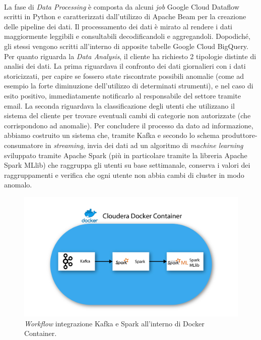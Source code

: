 \\
La fase di \emph{Data Processing} è composta da alcuni \emph{job} Google Cloud Dataflow scritti in Python e caratterizzati dall'utilizzo di Apache Beam per la creazione delle pipeline dei dati.
Il processamento dei dati è mirato al rendere i dati maggiormente leggibili e consultabili decodificandoli e aggregandoli. Dopodiché, gli stessi vengono scritti all'interno di apposite tabelle Google Cloud BigQuery.
\\
Per quanto riguarda la \emph{Data Analysis}, il cliente ha richiesto 2 tipologie distinte di analisi dei dati.
La prima riguardava il confronto dei dati giornalieri con i dati storicizzati, per capire se fossero state riscontrate possibili anomalie (come ad esempio la forte diminuzione dell'utilizzo di determinati strumenti), e nel caso di esito positivo, immediatamente notificarlo al responsabile del settore tramite email.
La seconda riguardava la classificazione degli utenti che utilizzano il sistema del cliente per trovare eventuali cambi di categorie non autorizzate (che corrispondono ad anomalie). Per concludere il processo da dato ad informazione, abbiamo costruito un sistema che, tramite Kafka e secondo lo schema produttore-consumatore in \emph{streaming}, invia dei dati ad un algoritmo di \emph{machine learning} sviluppato tramite Apache Spark (più in particolare tramite la libreria Apache Spark MLlib) che raggruppa gli utenti su base settimanale, conserva i valori dei raggruppamenti e verifica che ogni utente non abbia cambi di cluster in modo anomalo.\\
\begin{figure}[h!]
	\centering
	\includegraphics[scale=0.5]{figures/kafka_spark}
	\caption[Workflow integrazione Kafka e Spark.]{\emph{Workflow} integrazione Kafka e Spark all'interno di Docker Container.
		\label{fig:workflow2}}
\end{figure}	

